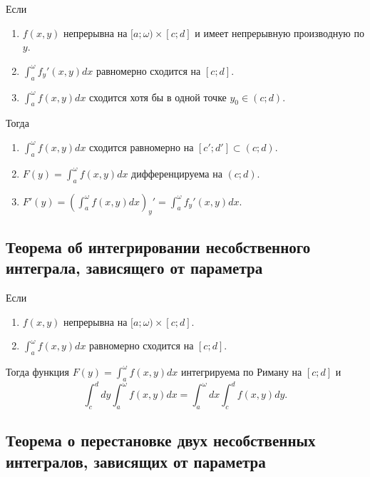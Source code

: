 \begin{theorem}\label{theorem:7.3.2}
    Если
    \begin{enumerate}
        \item $ f(x,y) $ непрерывна на $ [a;\omega)\times[c;d] $ и имеет непрерывную производную по $ y $.
        \item $ \int_{a}^{\omega}f_y'(x,y)dx $ равномерно сходится на $ [c;d] $.
        \item $ \int_{a}^{\omega}f(x,y)dx $ сходится хотя бы в одной точке $ y_0 \in (c;d) $.
    \end{enumerate}

    Тогда
    \begin{enumerate}
        \item $ \int_{a}^{\omega}f(x,y)dx $ сходится равномерно на $ [c';d']\subset (c;d) $.
        \item $ F(y) = \int_{a}^{\omega}f(x,y)dx $ дифференцируема на $ (c;d) $.
        \item $ F'(y) = \left(\int_{a}^{\omega}f(x,y)dx\right)_y' = \int_{a}^{\omega}f_y'(x,y)dx $.
    \end{enumerate}
\end{theorem}

\subsection{Теорема об интегрировании несобственного интеграла, зависящего от параметра}

\begin{theorem}\label{theorem:7.3.3}
    Если
    \begin{enumerate}
        \item $ f(x,y) $ непрерывна на $ [a;\omega)\times[c;d] $.
        \item $ \int_{a}^{\omega}f(x,y)dx $ равномерно сходится на $ [c;d] $.
    \end{enumerate}

    Тогда функция $ F(y) = \int_{a}^{\omega}f(x,y)dx $ интегрируема по Риману на $ [c;d] $ и
    \[
        \int_{c}^{d}dy \int_{a}^{\omega}f(x,y)dx = \int_{a}^{\omega}dx \int_{c}^{d}f(x,y)dy.
    \]
\end{theorem}

\subsection{Теорема о перестановке двух несобственных интегралов, зависящих от параметра}

